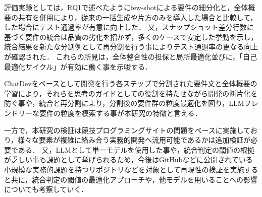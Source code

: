\documentclass[submit,techrep,noauthor]{ipsj}
\begin{document}
評価実験としては，RQ1で述べたようにfew-shotによる要件の細分化と，全体概要の共有を併用により，従来の一括生成や片方のみを導入した場合と比較して，した場合にテスト通過率が有意に向上した．
又，スナップショット差分行数に基づく要件の統合は品質の劣化を招かず，多くのケースで安定した挙動を示し，統合結果を新たな分割例として再分割を行う事によりテスト通過率の更なる向上が確認された．
これらの所見は，全体整合性の担保と局所最適化並びに，「自己最適化サイクル」が有効に働く事を示唆する．

ChatDevをベースとして開発を行う各ステップで分割された要件文と全体概要の学習により，それらを思考のガイドとしての役割を持たせながら開発の断片化を防ぐ事や，統合と再分割により，分割後の要件群の粒度最適化を図り，LLMフレンドリーな要件の粒度を模索する事が本研究の特徴と言える．

一方で，本研究の検証は競技プログラミングサイトの問題をベースに実施しており，様々な要素が複雑に絡み合う実務的開発へ流用可能であるかは追加検証が必要である．
又，LLMとして単一モデルを使用した事や，統合判定の閾値の根拠が乏しい事も課題として挙げられるため，今後はGitHubなどに公開されている小規模な実務的課題を持つリポジトリなどを対象として再現性の検証を実施すると共に，統合判定の閾値の最適化アプローチや，他モデルを用いることへの影響についても考察していく．




\end{document}

